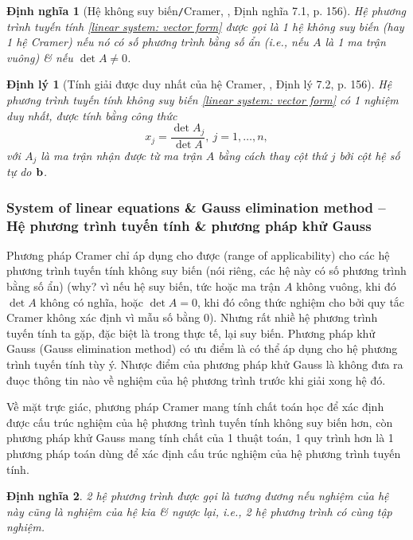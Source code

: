 \documentclass{article}
\newtheorem{dinhly}{Định lý}
\newtheorem{dinhnghia}{Định nghĩa}
\begin{document}
\begin{dinhnghia}[Hệ không suy biến{\tt/}Cramer, \cite{Hung_linear_algebra}, Định nghĩa 7.1, p. 156]
	Hệ phương trình tuyến tính \eqref{linear system: vector form} được gọi là 1 {\rm hệ không suy biến} (hay 1 {\rm hệ Cramer}) nếu nó có số phương trình bằng số ẩn (i.e., nếu $A$ là 1 ma trận vuông) \& nếu $\det A\ne 0$.
\end{dinhnghia}

\begin{dinhly}[Tính giải được duy nhất của hệ Cramer, \cite{Hung_linear_algebra}, Định lý 7.2, p. 156]
	Hệ phương trình tuyến tính không suy biến \eqref{linear system: vector form} có 1 nghiệm duy nhất, được tính bằng công thức
	\begin{equation*}
		x_j = \frac{\det A_j}{\det A},\ j = 1,\ldots,n,
	\end{equation*}
	với $A_j$ là ma trận nhận được từ ma trận $A$ bằng cách thay cột thứ $j$ bởi cột hệ số tự do ${\bf b}$.
\end{dinhly}


\subsubsection{System of linear equations \& Gauss elimination method -- Hệ phương trình tuyến tính \& phương pháp khử Gauss}
Phương pháp Cramer chỉ áp dụng cho được (range of applicability) cho các hệ phương trình tuyến tính không suy biến (nói riêng, các hệ này có số phương trình bằng số ẩn) (why? vì nếu hệ suy biến, tức hoặc ma trận $A$ không vuông, khi đó $\det A$ không có nghĩa, hoặc $\det A = 0$, khi đó công thức nghiệm cho bởi quy tắc Cramer không xác định vì mẫu số bằng 0). Nhưng rất nhiề hệ phương trình tuyến tính ta gặp, đặc biệt là trong thực tế, lại suy biến. Phương pháp khử Gauss (Gauss elimination method) có ưu điểm là có thể áp dụng cho hệ phương trình tuyến tính tùy ý. Nhược điểm của phương pháp khử Gauss là không đưa ra đuọc thông tin nào về nghiệm của hệ phương trình trước khi giải xong hệ đó.

Về mặt trực giác, phương pháp Cramer mang tính chất toán học để xác định được cấu trúc nghiệm của hệ phương trình tuyến tính không suy biến hơn, còn phương pháp khử Gauss mang tính chất của 1 thuật toán, 1 quy trình hơn là 1 phương pháp toán dùng để xác định cấu trúc nghiệm của hệ phương trình tuyến tính.

\begin{dinhnghia}
	2 hệ phương trình được gọi là {\rm tương đương} nếu nghiệm của hệ này cũng là nghiệm của hệ kia \& ngược lại, i.e., 2 hệ phương trình có cùng tập nghiệm.
\end{dinhnghia}
\end{document}
